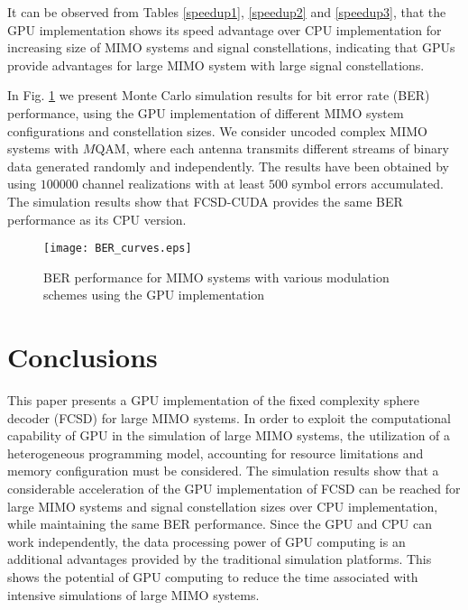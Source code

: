 \documentclass[letterpaper, 10pt, conference]{ieeeconf}
\begin{document}
It can be observed from Tables \ref{speedup1}, \ref{speedup2} and \ref{speedup3}, that the GPU implementation shows its speed advantage over CPU implementation for increasing size of MIMO systems and signal constellations, indicating that GPUs provide advantages for large MIMO system with large signal constellations.

In Fig. \ref{BER curve} we present Monte Carlo simulation results for bit error rate (BER) performance, using the GPU implementation of different MIMO system configurations and constellation sizes. We consider uncoded complex MIMO systems with $M$QAM, where each antenna transmits different streams of binary data generated randomly and independently. The results have been obtained by using $100000$ channel realizations with at least $500$ symbol errors accumulated. The simulation results show that FCSD-CUDA provides the same BER performance as its CPU version\cite{barbero2008fixing}.
\begin{figure}[htb]
\centering
\texttt{[image: BER\_curves.eps]}
\caption{BER performance for MIMO systems with various modulation schemes using the GPU implementation}
\label{BER curve}
\end{figure}
\section{Conclusions}\label{conclusion}
This paper presents a GPU implementation of the fixed complexity sphere decoder (FCSD) for large MIMO systems. In order to exploit the computational capability of GPU in the simulation of large MIMO systems, the utilization of a heterogeneous programming model, accounting for resource limitations and memory configuration must be considered. The simulation results show that a considerable acceleration of the GPU implementation of FCSD can be reached for large MIMO systems and signal constellation sizes over CPU implementation, while maintaining the same BER performance. Since the GPU and CPU can work independently, the data processing power of GPU computing is an additional advantages provided by the traditional simulation platforms. This shows the potential of GPU computing to reduce the time associated with intensive simulations of large MIMO systems.




\end{document}
